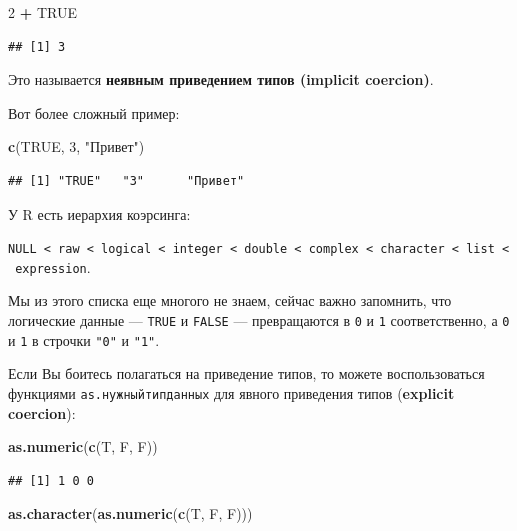 \documentclass[]{book}
\newenvironment{Shaded}{\begin{snugshade}}{\end{snugshade}}
\newcommand{\KeywordTok}[1]{\textcolor[rgb]{0.13,0.29,0.53}{\textbf{#1}}}
\newcommand{\DecValTok}[1]{\textcolor[rgb]{0.00,0.00,0.81}{#1}}
\newcommand{\StringTok}[1]{\textcolor[rgb]{0.31,0.60,0.02}{#1}}
\newcommand{\OtherTok}[1]{\textcolor[rgb]{0.56,0.35,0.01}{#1}}
\newcommand{\OperatorTok}[1]{\textcolor[rgb]{0.81,0.36,0.00}{\textbf{#1}}}
\newcommand{\NormalTok}[1]{#1}
\begin{document}
\begin{Shaded}
\begin{Highlighting}[]
\DecValTok{2} \OperatorTok{+}\StringTok{ }\OtherTok{TRUE}
\end{Highlighting}
\end{Shaded}

\begin{verbatim}
## [1] 3
\end{verbatim}

Это называется \textbf{неявным приведением типов (implicit coercion)}.

Вот более сложный пример:

\begin{Shaded}
\begin{Highlighting}[]
\KeywordTok{c}\NormalTok{(}\OtherTok{TRUE}\NormalTok{, }\DecValTok{3}\NormalTok{, }\StringTok{"Привет"}\NormalTok{)}
\end{Highlighting}
\end{Shaded}

\begin{verbatim}
## [1] "TRUE"   "3"      "Привет"
\end{verbatim}

У R есть иерархия коэрсинга:

\texttt{NULL\ \textless{}\ raw\ \textless{}\ logical\ \textless{}\ integer\ \textless{}\ double\ \textless{}\ complex\ \textless{}\ character\ \textless{}\ list\ \textless{}\ expression}.

Мы из этого списка еще многого не знаем, сейчас важно запомнить, что
логические данные --- \texttt{TRUE} и \texttt{FALSE} --- превращаются в
\texttt{0} и \texttt{1} соответственно, а \texttt{0} и \texttt{1} в
строчки \texttt{"0"} и \texttt{"1"}.

Если Вы боитесь полагаться на приведение типов, то можете
воспользоваться функциями \texttt{as.нужныйтипданных} для явного
приведения типов (\textbf{explicit coercion}):

\begin{Shaded}
\begin{Highlighting}[]
\KeywordTok{as.numeric}\NormalTok{(}\KeywordTok{c}\NormalTok{(T, F, F))}
\end{Highlighting}
\end{Shaded}

\begin{verbatim}
## [1] 1 0 0
\end{verbatim}

\begin{Shaded}
\begin{Highlighting}[]
\KeywordTok{as.character}\NormalTok{(}\KeywordTok{as.numeric}\NormalTok{(}\KeywordTok{c}\NormalTok{(T, F, F)))}
\end{Highlighting}
\end{Shaded}
\end{document}
